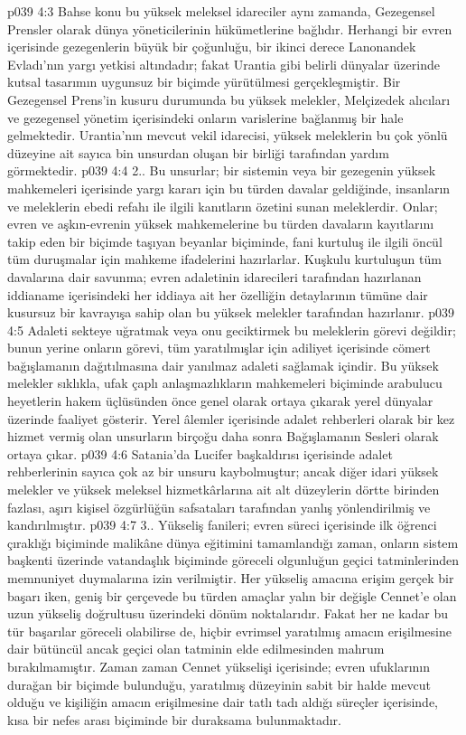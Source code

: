 \vs p039 4:3 Bahse konu bu yüksek meleksel idareciler aynı zamanda, Gezegensel Prensler olarak dünya yöneticilerinin hükümetlerine bağlıdır. Herhangi bir evren içerisinde gezegenlerin büyük bir çoğunluğu, bir ikinci derece Lanonandek Evladı’nın yargı yetkisi altındadır; fakat Urantia gibi belirli dünyalar üzerinde kutsal tasarımın uygunsuz bir biçimde yürütülmesi gerçekleşmiştir. Bir Gezegensel Prens’in kusuru durumunda bu yüksek melekler, Melçizedek alıcıları ve gezegensel yönetim içerisindeki onların varislerine bağlanmış bir hale gelmektedir. Urantia’nın mevcut vekil idarecisi, yüksek meleklerin bu çok yönlü düzeyine ait sayıca bin unsurdan oluşan bir birliği tarafından yardım görmektedir.
\vs p039 4:4 2.. Bu unsurlar; bir sistemin veya bir gezegenin yüksek mahkemeleri içerisinde yargı kararı için bu türden davalar geldiğinde, insanların ve meleklerin ebedi refahı ile ilgili kanıtların özetini sunan meleklerdir. Onlar; evren ve aşkın\hyp{}evrenin yüksek mahkemelerine bu türden davaların kayıtlarını takip eden bir biçimde taşıyan beyanlar biçiminde, fani kurtuluş ile ilgili öncül tüm duruşmalar için mahkeme ifadelerini hazırlarlar. Kuşkulu kurtuluşun tüm davalarına dair savunma; evren adaletinin idarecileri tarafından hazırlanan iddianame içerisindeki her iddiaya ait her özelliğin detaylarının tümüne dair kusursuz bir kavrayışa sahip olan bu yüksek melekler tarafından hazırlanır.
\vs p039 4:5 Adaleti sekteye uğratmak veya onu geciktirmek bu meleklerin görevi değildir; bunun yerine onların görevi, tüm yaratılmışlar için adiliyet içerisinde cömert bağışlamanın dağıtılmasına dair yanılmaz adaleti sağlamak içindir. Bu yüksek melekler sıklıkla, ufak çaplı anlaşmazlıkların mahkemeleri biçiminde arabulucu heyetlerin hakem üçlüsünden önce genel olarak ortaya çıkarak yerel dünyalar üzerinde faaliyet gösterir. Yerel âlemler içerisinde adalet rehberleri olarak bir kez hizmet vermiş olan unsurların birçoğu daha sonra Bağışlamanın Sesleri olarak ortaya çıkar.
\vs p039 4:6 Satania’da Lucifer başkaldırısı içerisinde adalet rehberlerinin sayıca çok az bir unsuru kaybolmuştur; ancak diğer idari yüksek melekler ve yüksek meleksel hizmetkârlarına ait alt düzeylerin dörtte birinden fazlası, aşırı kişisel özgürlüğün safsataları tarafından yanlış yönlendirilmiş ve kandırılmıştır.
\vs p039 4:7 3.\bibnobreakspace {}. Yükseliş fanileri; evren süreci içerisinde ilk öğrenci çıraklığı biçiminde malikâne dünya eğitimini tamamlandığı zaman, onların sistem başkenti üzerinde vatandaşlık biçiminde göreceli olgunluğun geçici tatminlerinden memnuniyet duymalarına izin verilmiştir. Her yükseliş amacına erişim gerçek bir başarı iken, geniş bir çerçevede bu türden amaçlar yalın bir değişle Cennet’e olan uzun yükseliş doğrultusu üzerindeki dönüm noktalarıdır. Fakat her ne kadar bu tür başarılar göreceli olabilirse de, hiçbir evrimsel yaratılmış amacın erişilmesine dair bütüncül ancak geçici olan tatminin elde edilmesinden mahrum bırakılmamıştır. Zaman zaman Cennet yükselişi içerisinde; evren ufuklarının durağan bir biçimde bulunduğu, yaratılmış düzeyinin sabit bir halde mevcut olduğu ve kişiliğin amacın erişilmesine dair tatlı tadı aldığı süreçler içerisinde, kısa bir nefes arası biçiminde bir duraksama bulunmaktadır.
